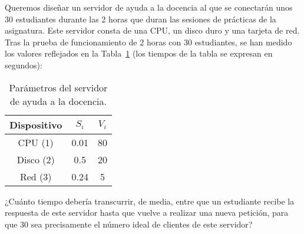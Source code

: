 \begin{ejercicio}\label{ej:5.33}
    Queremos diseñar un servidor de ayuda a la docencia al que se conectarán unos 30 estudiantes durante las 2 horas que duran las sesiones de prácticas de la asignatura. Este servidor consta de una CPU, un disco duro y una tarjeta de red. Tras la prueba de funcionamiento de 2 horas con 30 estudiantes, se han medido los valores reflejados en la Tabla~\ref{tab:5.33} (los tiempos de la tabla se expresan en segundos):
    \begin{table}[h]
        \centering
        \begin{tabular}{|c|c|c|}
            \hline
            Dispositivo & $S_i$ & $V_i$ \\
            \hline
            CPU (1) & 0.01 & 80 \\
            Disco (2) & 0.5 & 20 \\
            Red (3) & 0.24 & 5 \\
            \hline
        \end{tabular}
        \caption{Parámetros del servidor de ayuda a la docencia.}
        \label{tab:5.33}
    \end{table}
    ¿Cuánto tiempo debería transcurrir, de media, entre que un estudiante recibe la respuesta de este servidor hasta que vuelve a realizar una nueva petición, para que 30 sea precisamente el número ideal de clientes de este servidor?
\end{ejercicio}
\begin{comment}
\solucion
    El tiempo que debería transcurrir, de media, entre que un estudiante recibe la respuesta de este servidor hasta que vuelve a realizar una nueva petición es de 288 s.
\end{comment}
